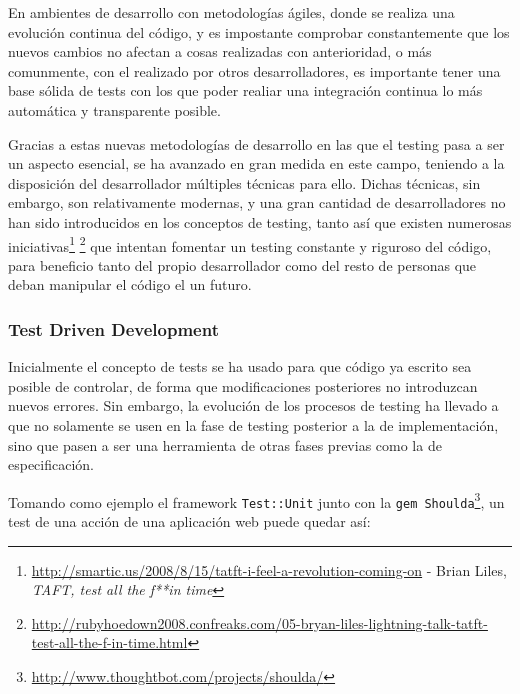 En ambientes de desarrollo con metodologías ágiles, donde se realiza una evolución continua del código, y es impostante comprobar constantemente que los nuevos cambios no afectan a cosas realizadas con anterioridad, o más comunmente, con el realizado por otros desarrolladores, es importante tener una base sólida de tests con los que poder realiar una integración continua lo más automática y transparente posible.

Gracias a estas nuevas metodologías de desarrollo en las que el testing pasa a ser un aspecto esencial, se ha avanzado en gran medida en este campo, teniendo a la disposición del desarrollador múltiples técnicas para ello. Dichas técnicas, sin embargo, son relativamente modernas, y una gran cantidad de desarrolladores no han sido introducidos en los conceptos de testing, tanto así que existen numerosas iniciativas\footnote{\url{http://smartic.us/2008/8/15/tatft-i-feel-a-revolution-coming-on} - Brian Liles, \emph{TAFT, test all the f**in time}} \footnote{\url{http://rubyhoedown2008.confreaks.com/05-bryan-liles-lightning-talk-tatft-test-all-the-f-in-time.html}} que intentan fomentar un testing constante y riguroso del código, para beneficio tanto del propio desarrollador como del resto de personas que deban manipular el código el un futuro. 

\subsubsection{Test Driven Development} %
\label{ssub:test_driven_development}

Inicialmente el concepto de tests se ha usado para que código ya escrito sea posible de controlar, de forma que modificaciones posteriores no introduzcan nuevos errores. Sin embargo, la evolución de los procesos de testing ha llevado a que no solamente se usen en la fase de testing posterior a la de implementación, sino que pasen a ser una herramienta de otras fases previas como la de especificación.

Tomando como ejemplo el framework \texttt{Test::Unit} junto con la \texttt{gem Shoulda}\footnote{\url{http://www.thoughtbot.com/projects/shoulda/}}, un test de una acción de una aplicación web puede quedar así:

%

